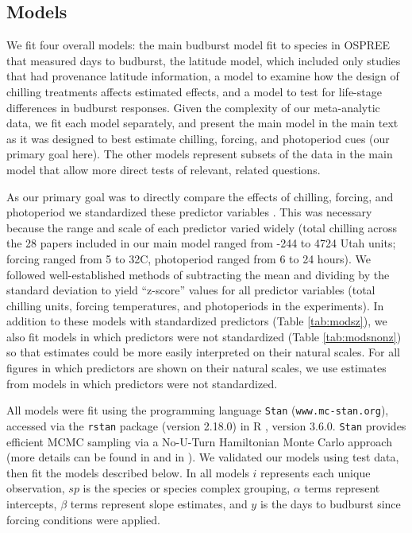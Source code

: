 \documentclass{article}
\begin{document}
\subsection*{Models}

\par We fit four overall models: the main budburst model fit to species in OSPREE that measured days to budburst, the latitude model, which included only studies that had provenance latitude information, a model to examine how the design of chilling treatments affects estimated effects, and a model to test for life-stage differences in budburst responses. Given the complexity of our meta-analytic data, we fit each model separately, and present the main model in the main text as it was designed to best estimate chilling, forcing, and photoperiod cues (our primary goal here). The other models represent subsets of the data in the main model that allow more direct tests of relevant, related questions. 

\par As our primary goal was to directly compare the effects of chilling, forcing, and photoperiod we standardized these predictor variables \emph{\citep{gelman2006}}. This was necessary because the range and scale of each predictor varied widely (total chilling across the 28 papers included in our main model ranged from -244 to 4724 Utah units; forcing ranged from 5 to 32\degree C, photoperiod ranged from 6 to 24 hours). We followed well-established methods of subtracting the mean and dividing by the standard deviation \emph{\citep{gelman2006}} to yield ``z-score'' values for all predictor variables (total chilling units, forcing temperatures, and photoperiods in the experiments).  In addition to these models with standardized predictors (Table \ref{tab:modsz}), we also fit models in which predictors were not standardized (Table \ref{tab:modsnonz}) so that estimates could be more easily interpreted on their natural scales. For all figures in which predictors are shown on their natural scales, we use estimates from models in which predictors were not standardized. 

\par All models were fit using the programming language \texttt{Stan} \emph{\citep{Carpenter:2016aa}} (\texttt{www.mc-stan.org}), accessed via the \texttt{rstan} package (version 2.18.0) in R \emph{\citep{Rcore:2017,rstan2018}}, version 3.6.0. \texttt{Stan} provides efficient MCMC sampling via a No-U-Turn Hamiltonian Monte Carlo approach (more details can be found in \emph{\citep{BDA}} and in \emph{\citep{Carpenter:2016aa}}). We validated our models using test data, then fit the models described below. In all models $i$ represents each unique observation, $sp$ is the species or species complex grouping, $\alpha$ terms represent intercepts, $\beta$ terms represent slope estimates, and $y$ is the days to budburst since forcing conditions were applied.  
\end{document}
